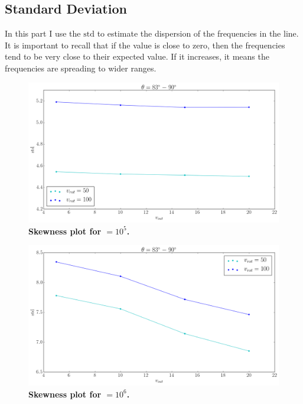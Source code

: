 \subsection{Standard Deviation}
In this part I use the $\mathrm{std}$ to estimate the dispersion of the frequencies in the \lya line. It is important to recall that if the value is close to zero, then the frequencies tend to be very close to their expected value. If it increases, it means the frequencies are spreading to wider ranges. \\

\begin{figure}[h!]
	\begin{center}
		\includegraphics[width=1\textwidth]{./figures/chapter3/tau10E5_std_phi83-90}
	\end{center}
	\caption{\textbf{Skewness plot for \tauh$=10^5$.} 
		\label{fig:tau10E5_std_phi83-90}}
\end{figure}

\begin{figure}[h!]
	\begin{center}
		\includegraphics[width=1\textwidth]{./figures/chapter3/tau10E6_std_phi83-90}
	\end{center}
	\caption{\textbf{Skewness plot for \tauh$=10^6$.} 
		\label{fig:tau10E6_std_phi83-90}}
\end{figure}

